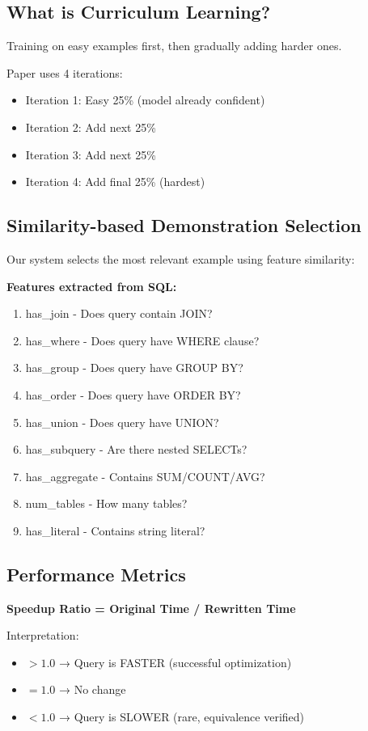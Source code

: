 \documentclass[12pt,a4paper]{article}
\begin{document}
\subsection{What is Curriculum Learning?}
Training on easy examples first, then gradually adding harder ones.

Paper uses 4 iterations:
\begin{itemize}
    \item Iteration 1: Easy 25\% (model already confident)
    \item Iteration 2: Add next 25\%
    \item Iteration 3: Add next 25\%
    \item Iteration 4: Add final 25\% (hardest)
\end{itemize}


\subsection{Similarity-based Demonstration Selection}
Our system selects the most relevant example using feature similarity:

\textbf{Features extracted from SQL:}
\begin{enumerate}
    \item has\_join - Does query contain JOIN?
    \item has\_where - Does query have WHERE clause?
    \item has\_group - Does query have GROUP BY?
    \item has\_order - Does query have ORDER BY?
    \item has\_union - Does query have UNION?
    \item has\_subquery - Are there nested SELECTs?
    \item has\_aggregate - Contains SUM/COUNT/AVG?
    \item num\_tables - How many tables?
    \item has\_literal - Contains string literal?
\end{enumerate} 

\subsection{Performance Metrics}
\textbf{Speedup Ratio = Original Time / Rewritten Time}

Interpretation:
\begin{itemize}
    \item $> 1.0$ → Query is FASTER (successful optimization)
    \item $= 1.0$ → No change
    \item $< 1.0$ → Query is SLOWER (rare, equivalence verified)
\end{itemize}
\end{document}
